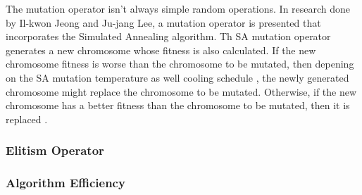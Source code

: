 The mutation operator isn't always simple random operations. In research done by Il-kwon Jeong and Ju-jang Lee, a mutation operator is presented that incorporates the Simulated Annealing algorithm. Th SA mutation operator generates a new chromosome whose fitness is also calculated. If the new chromosome fitness is worse than the chromosome to be mutated, then depening on the SA mutation temperature as well cooling schedule , the newly generated chromosome might replace the chromosome to be mutated. Otherwise, if the new chromosome has a better fitness than the chromosome to be mutated, then it is replaced \cite{AdaptiveSAGA}.

\subsubsection{Elitism Operator}
\subsubsection{Algorithm Efficiency}
